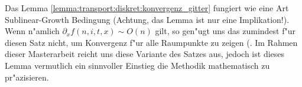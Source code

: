 Das Lemma \ref{lemma:transport:diskret:konvergenz_gitter} fungiert wie eine Art Sublinear-Growth Bedingung (Achtung, das Lemma ist nur eine Implikation!).
Wenn n"amlich $\partial_x f(n,i,t,x) \sim O(n)$ gilt, so gen"ugt uns das zumindest f"ur diesen Satz nicht, um Konvergenz f"ur alle Raumpunkte zu zeigen (.
Im Rahmen dieser Masterarbeit reicht uns diese Variante des Satzes aus, jedoch ist dieses Lemma vermutlich ein sinnvoller Einstieg die Methodik mathematisch zu pr"azisieren.
